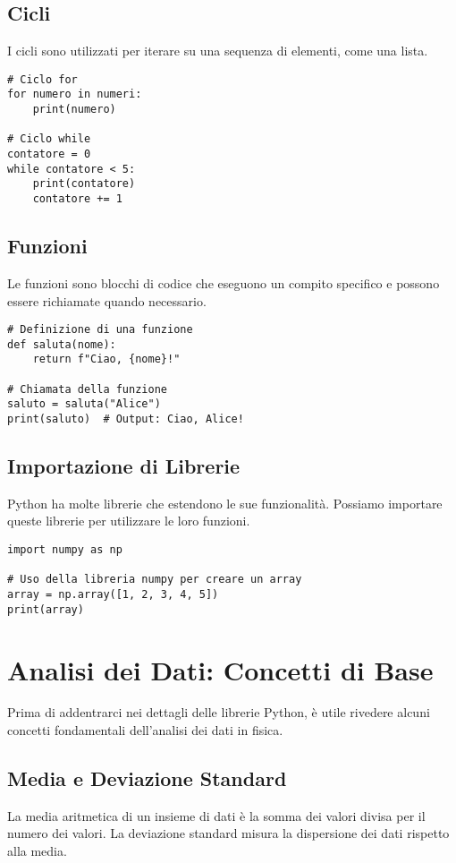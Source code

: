 \documentclass[12pt]{article}
\begin{document}
\subsection{Cicli}
I cicli sono utilizzati per iterare su una sequenza di elementi, come una lista.

\begin{verbatim}
# Ciclo for
for numero in numeri:
    print(numero)

# Ciclo while
contatore = 0
while contatore < 5:
    print(contatore)
    contatore += 1
\end{verbatim}

\subsection{Funzioni}
Le funzioni sono blocchi di codice che eseguono un compito specifico e possono essere richiamate quando necessario.

\begin{verbatim}
# Definizione di una funzione
def saluta(nome):
    return f"Ciao, {nome}!"

# Chiamata della funzione
saluto = saluta("Alice")
print(saluto)  # Output: Ciao, Alice!
\end{verbatim}

\subsection{Importazione di Librerie}
Python ha molte librerie che estendono le sue funzionalità. Possiamo importare queste librerie per utilizzare le loro funzioni.

\begin{verbatim}
import numpy as np

# Uso della libreria numpy per creare un array
array = np.array([1, 2, 3, 4, 5])
print(array)
\end{verbatim}

\section{Analisi dei Dati: Concetti di Base}
Prima di addentrarci nei dettagli delle librerie Python, è utile rivedere alcuni concetti fondamentali dell'analisi dei dati in fisica.

\subsection{Media e Deviazione Standard}
La media aritmetica di un insieme di dati è la somma dei valori divisa per il numero dei valori. La deviazione standard misura la dispersione dei dati rispetto alla media.
\end{document}
